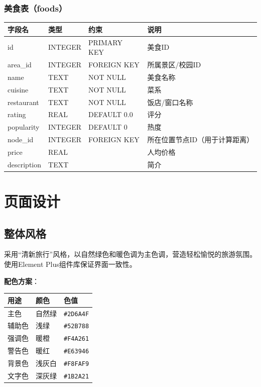 \documentclass[12pt,a4paper]{report}
\begin{document}
\subsection{美食表（foods）}

\begin{table}[H]
\centering
\small
\begin{tabular}{llll}
\toprule
\textbf{字段名} & \textbf{类型} & \textbf{约束} & \textbf{说明} \\
\midrule
id & INTEGER & PRIMARY KEY & 美食ID \\
area\_id & INTEGER & FOREIGN KEY & 所属景区/校园ID \\
name & TEXT & NOT NULL & 美食名称 \\
cuisine & TEXT & NOT NULL & 菜系 \\
restaurant & TEXT & NOT NULL & 饭店/窗口名称 \\
rating & REAL & DEFAULT 0.0 & 评分 \\
popularity & INTEGER & DEFAULT 0 & 热度 \\
node\_id & INTEGER & FOREIGN KEY & 所在位置节点ID（用于计算距离） \\
price & REAL & & 人均价格 \\
description & TEXT & & 简介 \\
\bottomrule
\end{tabular}
\end{table}


\chapter{页面设计}

\section{整体风格}

采用``清新旅行''风格，以自然绿色和暖色调为主色调，营造轻松愉悦的旅游氛围。使用Element Plus组件库保证界面一致性。

\textbf{配色方案}：
\begin{table}[H]
\centering
\begin{tabular}{lll}
\toprule
\textbf{用途} & \textbf{颜色} & \textbf{色值} \\
\midrule
主色 & 自然绿 & \texttt{\#2D6A4F} \\
辅助色 & 浅绿 & \texttt{\#52B788} \\
强调色 & 暖橙 & \texttt{\#F4A261} \\
警告色 & 暖红 & \texttt{\#E63946} \\
背景色 & 浅灰白 & \texttt{\#F8FAF9} \\
文字色 & 深灰绿 & \texttt{\#1B2A21} \\
\bottomrule
\end{tabular}
\end{table}
\end{document}
